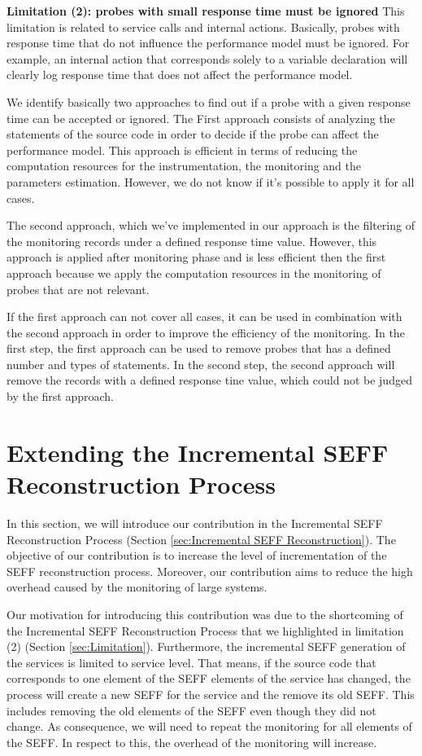 \textbf{Limitation (2): probes with small response time must be ignored}
This limitation is related to service calls and internal actions. Basically, probes with response time that do not influence the performance model must be ignored. For example, an internal action that corresponds solely to a variable declaration will clearly log response time that does not affect the performance model.
 
We identify basically two approaches to find out if a probe with a given response time can be accepted or ignored. The First approach consists of analyzing the statements of the source code in order to decide if the probe can affect the performance model. This approach is efficient in terms of reducing the computation resources for the instrumentation, the monitoring and the parameters estimation.  However, we do not know if it's possible to apply it for all cases.

The second approach, which we've implemented in our approach is the filtering of the monitoring records under a defined response time value. However, this approach is applied after monitoring phase and is less efficient then the first approach because we apply the computation resources in the monitoring of probes that are not relevant. 

If the first approach can not cover all cases, it can be used in combination with the second approach in order to improve the efficiency of the monitoring. In the first step, the first approach can be used to remove probes that has a defined number and types of statements. In the second step, the second approach will remove the records with a defined response tine value, which could not be judged by the first approach.

\section{Extending the Incremental SEFF Reconstruction Process}
\label{sec:extend the incremental SEFF reconstruction process}
In this section, we will introduce our contribution in the Incremental SEFF Reconstruction Process (Section \ref{sec:Incremental SEFF Reconstruction}). The objective of our contribution is to increase the level of incrementation of the SEFF reconstruction process. Moreover, our contribution aims to reduce the high overhead caused by the monitoring of large systems.

Our motivation for introducing this contribution was due to the shortcoming of the Incremental SEFF Reconstruction Process that we highlighted in limitation (2) (Section \ref{sec:Limitation}). Furthermore, the incremental SEFF generation of the services is limited to service level. That means, if the source code that corresponds to one element of the SEFF elements of the service has changed, the process will create a new SEFF for the service and the remove its old SEFF. This includes removing the old elements of the SEFF even though they did not change. As consequence, we will need to repeat the monitoring for all elements of the SEFF. In respect to this, the overhead of the monitoring will increase.

